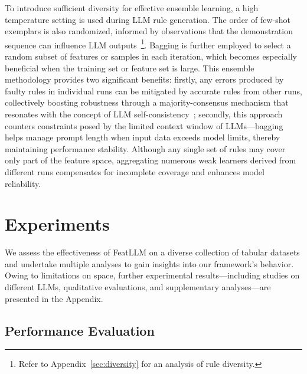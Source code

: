 To introduce sufficient diversity for effective ensemble learning, a high temperature setting is used during LLM rule generation. The order of few-shot exemplars is also randomized, informed by observations that the demonstration sequence can influence LLM outputs~\cite{lu2022fantastically}\footnote{Refer to Appendix~\ref{sec:diversity} for an analysis of rule diversity.}. Bagging is further employed to select a random subset of features or samples in each iteration, which becomes especially beneficial when the training set or feature set is large. This ensemble methodology provides two significant benefits: firstly, any errors produced by faulty rules in individual runs can be mitigated by accurate rules from other runs, collectively boosting robustness through a majority-consensus mechanism that resonates with the concept of LLM self-consistency~\cite{wang2022self}; secondly, this approach counters constraints posed by the limited context window of LLMs—bagging helps manage prompt length when input data exceeds model limits, thereby maintaining performance stability. Although any single set of rules may cover only part of the feature space, aggregating numerous weak learners derived from different runs compensates for incomplete coverage and enhances model reliability.

\section{Experiments}
We assess the effectiveness of \textsf{FeatLLM} on a diverse collection of tabular datasets and undertake multiple analyses to gain insights into our framework's behavior. Owing to limitations on space, further experimental results—including studies on different LLMs, qualitative evaluations, and supplementary analyses—are presented in the Appendix.

\subsection{Performance Evaluation}
